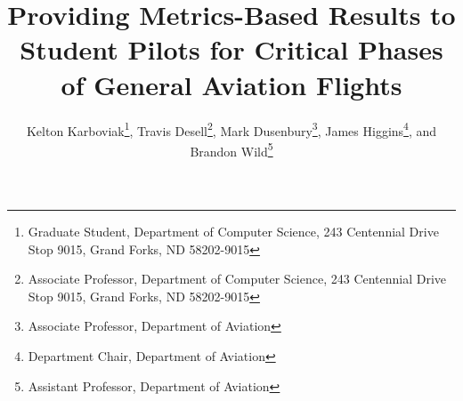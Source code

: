 \documentclass{AIAA}
\begin{document}
\title{Providing Metrics-Based Results to Student Pilots for Critical Phases of General Aviation Flights}

\author{
	Kelton Karboviak\footnote{Graduate Student, Department of Computer Science, 243 Centennial Drive Stop 9015, Grand Forks, ND 58202-9015},
	Travis Desell\footnote{Associate Professor, Department of Computer Science, 243 Centennial Drive Stop 9015, Grand Forks, ND 58202-9015},
	Mark Dusenbury\footnote{Associate Professor, Department of Aviation},
	James Higgins\footnote{Department Chair, Department of Aviation}, and
	Brandon Wild\footnote{Assistant Professor, Department of Aviation}
}






\maketitle


\end{document}
